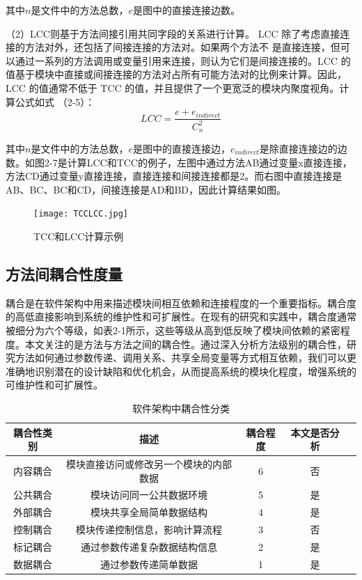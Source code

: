 其中\(n\)是文件中的方法总数，\(e\)是图中的直接连接边数。

（2）LCC则基于方法间接引用共同字段的关系进行计算\cite{1995Cohesion}。
LCC 除了考虑直接连接的方法对外，还包括了间接连接的方法对。如果两个方法不
是直接连接，但可以通过一系列的方法调用或变量引用来连接，则认为它们是间接连接的。LCC 的值基于模块中直接或间接连接的方法对占所有可能方法对的比例来计算。因此，LCC 的值通常不低于 TCC 的值，并且提供了一个更宽泛的模块内聚度视角。计算公式如式 （2-5）：
\begin{equation}
{LCC=\frac{e+e_{indirect}}{C_{n}^{2}}}
\end{equation}

其中\(n\)是文件中的方法总数，\(e\)是图中的直接连接边，\(e_{indirect}\)是除直接连接边的边数。如图2-7是计算LCC和TCC的例子，左图中通过方法AB通过变量x直接连接，方法CD通过变量y直接连接，直接连接和间接连接都是2。而右图中直接连接是AB、BC、BC和CD，间接连接是AD和BD，因此计算结果如图。

\begin{figure}[h]
\centering
\texttt{[image: TCCLCC.jpg]}
\caption{TCC和LCC计算示例}
\end{figure}


\subsection{方法间耦合性度量}

耦合是在软件架构中用来描述模块间相互依赖和连接程度的一个重要指标。耦合度的高低直接影响到系统的维护性和可扩展性。在现有的研究和实践中，耦合度通常被细分为六个等级，如表2-1所示，这些等级从高到低反映了模块间依赖的紧密程度。本文关注的是方法与方法之间的耦合性。通过深入分析方法级别的耦合性，研究方法如何通过参数传递、调用关系、共享全局变量等方式相互依赖，我们可以更准确地识别潜在的设计缺陷和优化机会，从而提高系统的模块化程度，增强系统的可维护性和可扩展性。

\begin{table}[htbp]
\caption{软件架构中耦合性分类}
\vspace{0.5em}\centering\wuhao
\begin{tabular}{ccccc}
\toprule
耦合性类别 & 描述 & 耦合程度 & 本文是否分析 \\
\midrule
内容耦合 & 模块直接访问或修改另一个模块的内部数据 & 6 & 否\\
公共耦合 & 模块访问同一公共数据环境 & 5 & 是 \\
外部耦合 & 模块共享全局简单数据结构 & 4 & 是 \\
控制耦合 & 模块传递控制信息，影响计算流程 & 3 & 否 \\
标记耦合 & 通过参数传递复杂数据结构信息 & 2 & 是 \\
数据耦合 & 通过参数传递简单数据 & 1 & 是 \\
\bottomrule
\end{tabular}
\end{table}


